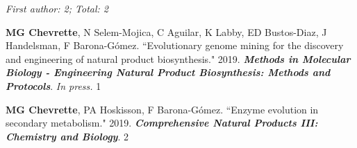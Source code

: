 
 \vspace{-2mm}

\begin{cvpubs}

\cvpub
{\hspace{-1cm} \textit{First author: 2; Total: 2}}
{}

\cvpub
{\textbf{MG Chevrette}, N Selem-Mojica, C Aguilar, K Labby, ED Bustos-Diaz, J Handelsman, F Barona-G\'{o}mez. ``Evolutionary genome mining for the discovery and engineering of natural product biosynthesis." 2019. \textit{\textbf{Methods in Molecular Biology - Engineering Natural Product Biosynthesis: Methods and Protocols}}. \textit{In press.}}
{1}

\cvpub
{\textbf{MG Chevrette}, PA Hoskisson, F Barona-G\'{o}mez. ``Enzyme evolution in secondary metabolism." 2019. \textit{\textbf{Comprehensive Natural Products III: Chemistry and Biology}}. \textbf{\textit{}}}
{2}

\end{cvpubs}


 \vspace{-2mm}

